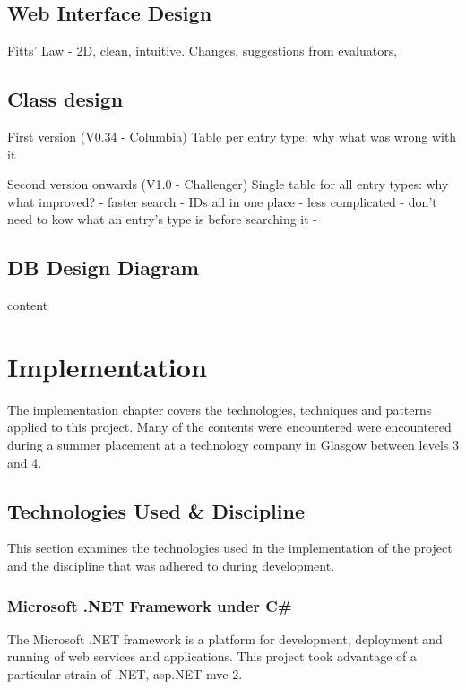 \documentclass{l4proj}
\begin{document}
\section{Web Interface Design}
Fitts' Law - 2D, clean, intuitive. Changes, suggestions from evaluators, 

\section{Class design}
First version (V0.34 - Columbia)
Table per entry type:
why
what was wrong with it

Second version onwards (V1.0 - Challenger)
Single table for all entry types:
why
what improved?
 - faster search
 - IDs all in one place - less complicated - don't need to kow what an entry's type is before searching it
 - 

\section{DB Design Diagram}
content


\chapter{Implementation}
\label{impl}
The implementation chapter covers the technologies, techniques and patterns applied to this project.  Many of the contents were encountered were encountered during a summer placement at a technology company in Glasgow between levels 3 and 4.  

\section{Technologies Used \& Discipline}
This section examines the technologies used in the implementation of the project and the discipline that was adhered to during development.

\subsection{Microsoft .NET Framework under C\#}
The Microsoft .NET framework is a platform for development, deployment and running of web services and applications\cite{whatIsDotNet}. This project took advantage of a particular strain of .NET, \gls{asp}.NET \gls{mvc} 2.  
\end{document}
